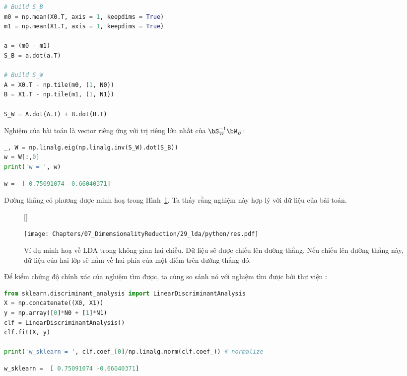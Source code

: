 \begin{lstlisting}[language=Python]
# Build S_B
m0 = np.mean(X0.T, axis = 1, keepdims = True)
m1 = np.mean(X1.T, axis = 1, keepdims = True)

a = (m0 - m1)
S_B = a.dot(a.T)

# Build S_W
A = X0.T - np.tile(m0, (1, N0))
B = X1.T - np.tile(m1, (1, N1))

S_W = A.dot(A.T) + B.dot(B.T)
\end{lstlisting}
Nghiệm của bài toán là vector riêng ứng với trị riêng lớn nhất của
$\bS_W^{-1}\bW_B$: %
\begin{lstlisting}[language=Python]
_, W = np.linalg.eig(np.linalg.inv(S_W).dot(S_B))
w = W[:,0]
print('w = ', w)
\end{lstlisting}
\kq
\begin{lstlisting}[language=Python]
w =  [ 0.75091074 -0.66040371]
\end{lstlisting}

Đường thẳng có phương  được minh hoạ trong Hình~\ref{fig:29_4}. Ta thấy rằng nghiệm này hợp lý với dữ liệu của bài toán.
\begin{figure}[t]
[\FBwidth]
{\caption{
Ví dụ minh hoạ về LDA trong không gian hai chiều. Dữ liệu sẽ được chiếu lên đường thằng. Nếu chiếu lên
đường thẳng này, dữ liệu của hai lớp sẽ nằm về hai phía của một điểm
trên đường thẳng đó.
}
\label{fig:29_4}}
{ %
\texttt{[image: Chapters/07\_DimemsionalityReduction/29\_lda/python/res.pdf]}
}
\end{figure}

Để kiểm chứng độ chính xác của nghiệm tìm được, ta cùng so sánh nó với nghiệm tìm được bởi thư viện :
\begin{lstlisting}[language=Python]
from sklearn.discriminant_analysis import LinearDiscriminantAnalysis
X = np.concatenate((X0, X1))
y = np.array([0]*N0 + [1]*N1)
clf = LinearDiscriminantAnalysis()
clf.fit(X, y)

print('w_sklearn = ', clf.coef_[0]/np.linalg.norm(clf.coef_)) # normalize
\end{lstlisting}

\begin{lstlisting}[language=Python]
w_sklearn =  [ 0.75091074 -0.66040371]
\end{lstlisting}

